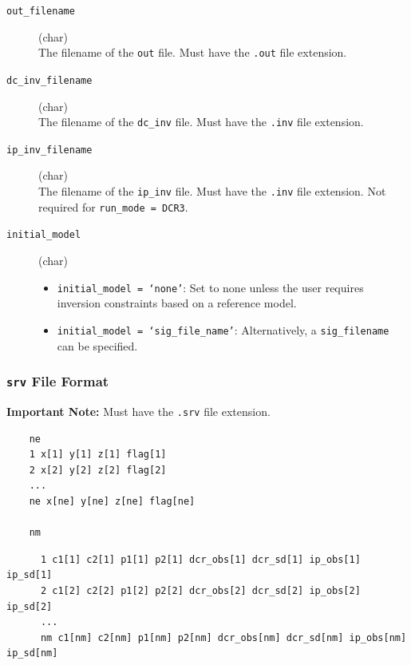 \documentclass[a4paper,12pt]{article}
\begin{document}
\begin{description}
    \item[\texttt{out\_filename}] (char)\hfill \\
    The filename of the \texttt{out} file. Must have the \texttt{.out} file extension.

    \item[\texttt{dc\_inv\_filename}] (char)\hfill \\
    The filename of the \texttt{dc\_inv} file. Must have the \texttt{.inv} file extension.

    \item[\texttt{ip\_inv\_filename}] (char)\hfill \\
    The filename of the \texttt{ip\_inv} file. Must have the \texttt{.inv} file extension. Not required for \texttt{run\_mode = DCR3}.

    \item[\texttt{initial\_model}] (char)\hfill \\
    \begin{itemize}
        \item \texttt{initial\_model = `none'}: Set to none unless the user requires inversion constraints based on a reference model.
        \item \texttt{initial\_model = `sig\_file\_name'}: Alternatively, a \texttt{sig\_filename} can be specified.
    \end{itemize}
\end{description}





\subsubsection{\texttt{srv} File Format} \label{forward_srv}

\begin{framed}
\noindent \textbf{Important Note:} Must have the \texttt{.srv} file extension.
\end{framed}

\begin{framed}
\begin{verbatim}
    ne
    1 x[1] y[1] z[1] flag[1]
    2 x[2] y[2] z[2] flag[2]
    ...
    ne x[ne] y[ne] z[ne] flag[ne]

    nm
\end{verbatim}

\begingroup
\scriptsize
\begin{verbatim}
      1 c1[1] c2[1] p1[1] p2[1] dcr_obs[1] dcr_sd[1] ip_obs[1] ip_sd[1]
      2 c1[2] c2[2] p1[2] p2[2] dcr_obs[2] dcr_sd[2] ip_obs[2] ip_sd[2]
      ...
      nm c1[nm] c2[nm] p1[nm] p2[nm] dcr_obs[nm] dcr_sd[nm] ip_obs[nm] ip_sd[nm]
\end{verbatim}
\endgroup
\end{framed}
\end{document}
